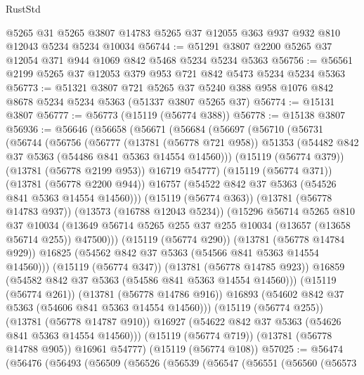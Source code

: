 \begin{lexlean}{RustStd}
\begin{coremodule}
    @5265
    @31
    @5265
    @3807
    @14783
    @5265
    @37
    @12055
    @363
    @937
    @932
    @810
    @12043
    @5234
    @5234
    @10034
@56744 := @51291 @3807 @2200 @5265 @37 @12054 @371 @944 @1069 @842 @5468 @5234 @5234 @5363
@56756 := @56561 @2199 @5265 @37 @12053 @379 @953 @721 @842 @5473 @5234 @5234 @5363
@56773 := @51321
    @3807
    @721
    @5265
    @37
    @5240
    @388
    @958
    @1076
    @842
    @8678
    @5234
    @5234
    @5363
    (@51337 @3807 @5265 @37)
@56774 := @15131 @3807
@56777 := @56773 (@15119 (@56774 @388))
@56778 := @15138 @3807
@56936 := @56646
    (@56658
      (@56671
        (@56684
          (@56697
            (@56710
              (@56731
                (@56744
                  (@56756
                    (@56777
                      (@13781 (@56778 @721 @958))
                      @51353
                      (@54482 @842 @37 @5363 (@54486 @841 @5363 @14554 @14560)))
                    (@15119 (@56774 @379))
                    (@13781 (@56778 @2199 @953))
                    @16719
                    @54777)
                  (@15119 (@56774 @371))
                  (@13781 (@56778 @2200 @944))
                  @16757
                  (@54522 @842 @37 @5363 (@54526 @841 @5363 @14554 @14560)))
                (@15119 (@56774 @363))
                (@13781 (@56778 @14783 @937))
                (@13573 (@16788 @12043 @5234))
                (@15296
                  @56714
                  @5265
                  @810
                  @37
                  @10034
                  (@13649 @56714 @5265 @255 @37 @255 @10034 (@13657 (@13658 @56714 @255)) @47500)))
              (@15119 (@56774 @290))
              (@13781 (@56778 @14784 @929))
              @16825
              (@54562 @842 @37 @5363 (@54566 @841 @5363 @14554 @14560)))
            (@15119 (@56774 @347))
            (@13781 (@56778 @14785 @923))
            @16859
            (@54582 @842 @37 @5363 (@54586 @841 @5363 @14554 @14560)))
          (@15119 (@56774 @261))
          (@13781 (@56778 @14786 @916))
          @16893
          (@54602 @842 @37 @5363 (@54606 @841 @5363 @14554 @14560)))
        (@15119 (@56774 @255))
        (@13781 (@56778 @14787 @910))
        @16927
        (@54622 @842 @37 @5363 (@54626 @841 @5363 @14554 @14560)))
      (@15119 (@56774 @719))
      (@13781 (@56778 @14788 @905))
      @16961
      @54777)
    (@15119 (@56774 @108))
@57025 := @56474
    (@56476
      (@56493
        (@56509
          (@56526
            (@56539
              (@56547
                (@56551
                  (@56560
                    (@56573

\end{coremodule}
\end{lexlean}
